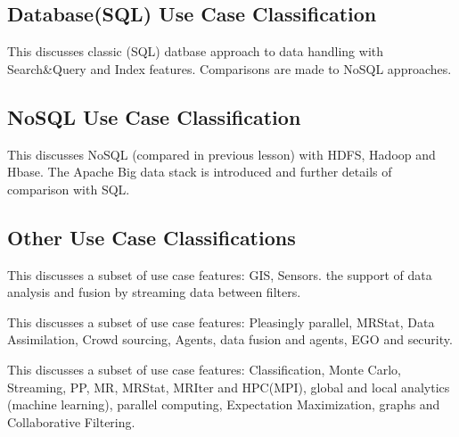 


\subsection{Database(SQL) Use Case
Classification}\label{databasesql-use-case-classification}

This discusses classic (SQL) datbase approach to data handling with
Search\&Query and Index features. Comparisons are made to NoSQL
approaches.




\subsection{NoSQL Use Case Classification}

This discusses NoSQL (compared in previous lesson) with HDFS, Hadoop and
Hbase. The Apache Big data stack is introduced and further details of
comparison with SQL.




\subsection{Other Use Case Classifications}

This discusses a subset of use case features: GIS, Sensors. the support
of data analysis and fusion by streaming data between filters.



This discusses a subset of use case features: Pleasingly parallel,
MRStat, Data Assimilation, Crowd sourcing, Agents, data fusion and
agents, EGO and security.



This discusses a subset of use case features: Classification, Monte
Carlo, Streaming, PP, MR, MRStat, MRIter and HPC(MPI), global and local
analytics (machine learning), parallel computing, Expectation
Maximization, graphs and Collaborative Filtering.


